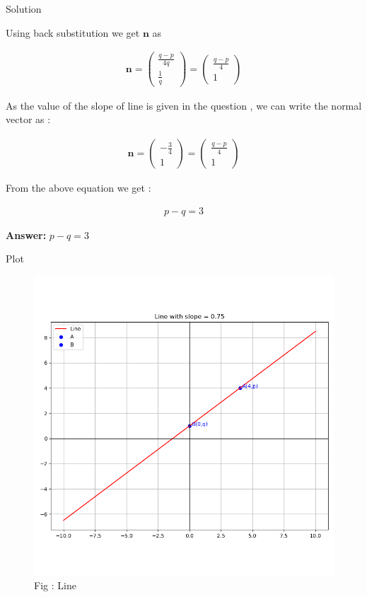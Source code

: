 \documentclass{beamer}
\numberwithin{equation}{section}
\theoremstyle{remark}
\newcommand{\myvec}[1]{\ensuremath{\begin{pmatrix}#1\end{pmatrix}}}
\let\vec\mathbf
\begin{document}
\begin{frame}{Solution}

Using back substitution we get $\vec{n}$ as 

\begin{align}
  \vec{n} = \myvec{\tfrac{q-p}{4q}\\\tfrac{1}{q}} = \myvec{\tfrac{q-p}{4}\\1}  
\end{align}

As the value of the slope of line is given in the question , we can write the normal vector as :

\begin{align}
  \vec{n} = \myvec{-\tfrac{3}{4}\\1} = \myvec{\tfrac{q-p}{4}\\1}   
\end{align}

From the above equation we get :

\begin{align}
p - q = 3
\end{align}

\textbf{Answer: } \(p-q = 3\)

\end{frame}

\begin{frame}{Plot}

\begin{figure}[h!]
  \centering
  \includegraphics[width=0.63\columnwidth]{figs/line.png} 
   \caption*{Fig : Line}
  \label{Fig1}
\end{figure}

\end{frame}
\end{document}
